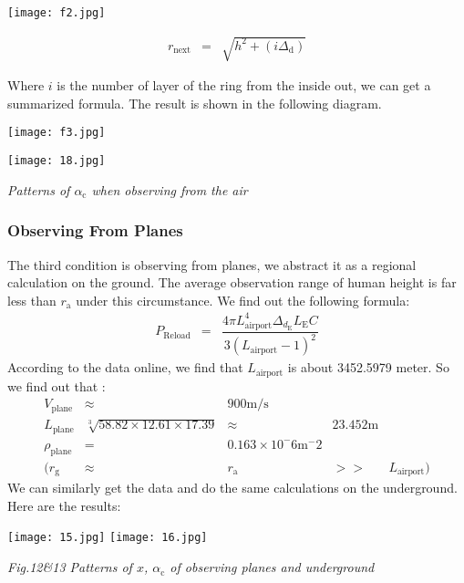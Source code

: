 \documentclass[12pt]{article}
\theoremstyle{definition}
\theoremstyle{remark}
\numberwithin{equation}{section}
\begin{document}
		\begin{center}
			\texttt{[image: f2.jpg]}
		\end{center}
	
		\begin{align}
			r_\mathrm{next}&=&\sqrt{h^2+\left(i\Delta_\mathrm{d}\right)}
		\end{align}
		
		Where $i$ is the number of layer of the ring from the inside out, we can get a summarized formula. The result is shown in the following diagram.
		
		\begin{center}
			\texttt{[image: f3.jpg]}
			
			\texttt{[image: 18.jpg]}
			
			\textit{Patterns of $\alpha_\mathrm{c}$ when observing from the air}
		\end{center}
		
		\subsubsection{Observing From Planes}
		The third condition is observing from planes, we abstract it as a regional calculation on the ground. The average observation range of human height is far less than $r_\mathrm{a}$ under this circumstance. We find out the following formula:
		\begin{align}
			P_\mathrm{Reload}&=&\dfrac{4\pi L_\mathrm{airport}^4 \Delta_{d_\mathrm{E}} L_\mathrm{E}C}{3\left(L_\mathrm{airport}-1\right)^2}
		\end{align}
		According to the data online, we find that $L_\mathrm{airport}$ is about 3452.5979 meter. So we find out that :
		\begin{align}
			V_\mathrm{plane}&\approx&900\mathrm{m/s}\\
			L_\mathrm{plane}&\sqrt[3]{58.82\times12.61\times17.39}&\approx&23.452\mathrm{m}\\
			\rho_\mathrm{plane}&=&0.163\times10^-6\mathrm{m^-2}\\
			(r_\mathrm{g}&\approx&r_\mathrm{a}&>>&L_\mathrm{airport})
		\end{align}
		We can similarly get the data and do the same calculations on the underground. Here are the results:
		\begin{center}
		\texttt{[image: 15.jpg]}
		\texttt{[image: 16.jpg]}
		
		\textit{Fig.12\&13 Patterns of $x$, $\alpha_\mathrm{c}$ of observing planes and underground}
		\end{center}
		
\end{document}
